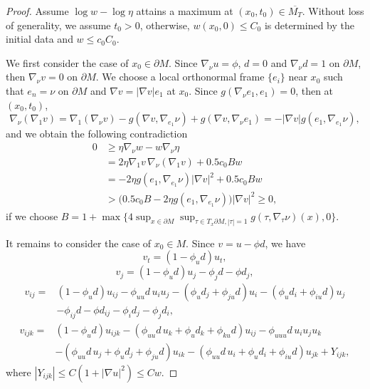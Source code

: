 \documentclass[12pt]{amsart}
\theoremstyle{definition}
\theoremstyle{remark}
\numberwithin{equation}{section}
\begin{document}
\begin{proof}
	Assume $\log w - \log \eta$ attains a maximum at $(x_0, t_0) \in \overline{M_T}$. Without loss of generality, we assume $t_0 > 0$, otherwise, $w(x_0, 0) \leq C_0$ is determined by the initial data and $w \leq c_0 C_0$.
	
	We first consider the case of $x_0 \in \partial M$. Since $\nabla_{\nu} u = \phi$, $d = 0$ and $\nabla_{\nu}d = 1$ on $\partial M$, then $\nabla_{\nu} v = 0$ on $\partial M$. We choose a local orthonormal frame $\{e_i\}$ near $x_0$ such that $e_n = \nu$ on $\partial M$ and $\nabla v = |\nabla v|e_1$ at $x_0$. 
	Since $g(\nabla_\nu e_1, e_1) = 0$, then at $(x_0, t_0)$,
	\begin{equation}
	\nabla_\nu (\nabla_1 v) = \nabla_1 (\nabla_{\nu} v) - g(\nabla v, \nabla_{e_1} \nu) + g(\nabla v, \nabla_{\nu} e_1) = - |\nabla v| g(e_1, \nabla_{e_1} \nu),
	\end{equation}
	and we obtain the following contradiction
	\begin{equation}
	\begin{aligned}
	0 & \geq \eta \nabla_{\nu} w - w \nabla_{\nu} \eta\\
	& = 2\eta \nabla_1 v \, \nabla_{\nu}(\nabla_1 v) + 0.5 c_0 Bw\\
	& = - 2\eta g(e_1, \nabla_{e_1} \nu) |\nabla v|^2 + 0.5 c_0 Bw\\
	& > \big(0.5 c_0 B - 2\eta g(e_1, \nabla_{e_1} \nu) \big)|\nabla v|^2 \geq 0,
	\end{aligned}
	\end{equation}
	if we choose $B = 1 + \max \{ 4 \sup_{x\in \partial M} \sup_{\tau \in T_x \partial M, |\tau|=1} g(\tau, \nabla_\tau \nu) (x), 0 \}$.
	
	
	It remains to consider the case of $x_0 \in M$.
	Since $v = u - \phi d$, we have
	\begin{equation}
	v_t = (1 - \phi_u d) u_t,
	\end{equation}
	\begin{equation}
	v_j = (1 - \phi_u d) u_j -\phi_j d - \phi d_j,
	\end{equation}
	\begin{equation}\label{C1_v_ij}
	\begin{aligned}
	v_{ij} =& (1 - \phi_u d) u_{ij} - \phi_{uu} d\, u_i u_j
	- (\phi_u d_j + \phi_{ju}d) u_i - (\phi_u d_i + \phi_{iu}d) u_j\\
	& - \phi_{ij} d - \phi d_{ij} - \phi_i d_j - \phi_j d_i,
	\end{aligned}
	\end{equation}
	\begin{equation}\label{C1_v_ijk}
	\begin{aligned}
	v_{ijk} =& (1 - \phi_u d) u_{ijk} - (\phi_{uu}d\, u_k + \phi_u d_k + \phi_{ku} d)u_{ij} - \phi_{uuu}d\,u_i u_j u_k\\
	&  - (\phi_{uu}d\, u_j + \phi_u d_j + \phi_{ju}d) u_{ik} - (\phi_{uu}d\, u_i + \phi_u d_i + \phi_{iu}d) u_{jk} + Y_{ijk},
	\end{aligned}
	\end{equation}
	where $|Y_{ijk}| \leq C(1 + |\nabla u|^2) \leq Cw$.
	

\end{proof}
\end{document}
